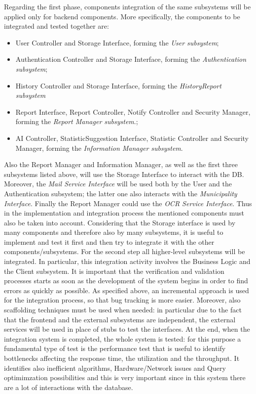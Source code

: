 \documentclass{report}
\begin{document}
\noindent Regarding the first phase, components integration of the same subsystems will be applied only for backend components. More specifically, the components to be integrated and tested together are:
\begin{itemize}
\item User Controller and Storage Interface, forming the \textit{User subsystem};
\item Authentication Controller and Storage Interface, forming the \textit{Authentication subsystem};
\item History Controller and Storage Interface, forming the \textit{HistoryReport subsystem}
\item Report Interface, Report Controller, Notify Controller and Security Manager, forming the \textit{Report Manager subsystem}.;
\item AI Controller, StatisticSuggestion Interface, Statistic Controller and Security Manager, forming the \textit{Information Manager subsystem}.
\end{itemize}
Also the Report Manager and Information Manager, as well as the first three subsystems listed above, will use the Storage Interface to interact with the DB. Moreover, the \textit{Mail Service Interface} will be used both by the User and the Authentication subsystem; the latter one also interacts with the \textit{Municipality Interface}. Finally the Report Manager could use the \textit{OCR Service Interface}. Thus in the implementation and integration process the mentioned components must also be taken into account. 
Considering that the Storage interface is used by many components and therefore also by many subsystems, it is useful to implement and test it first and then try to integrate it with the other components/subsystems. 
\newline
\newline
For the second step all higher-level subsystems will be integrated. In particular, this integration activity involves the Business Logic and the Client subsystem.
\newline
It is important that the verification and validation processes starts as soon as the development of the system begins in order to find errors as quickly as possible. As specified above, an incremental approach is used for the integration process, so that bug tracking is more easier. Moreover, also scaffolding techniques must be used when needed: in particular due to the fact that the frontend and the external subsystems are independent, the external services will be used in place of stubs to test the interfaces.
\newline
At the end, when the integration system is completed, the whole system is tested: for this purpose a fundamental type of test is the performance test that is useful to identify bottlenecks affecting the response time, the utilization and the throughput. It identifies also inefficient algorithms, Hardware/Network issues and Query optimimzation possibilities and this is very important since in this system there are a lot of interactions with the database. 
\newpage
\end{document}
